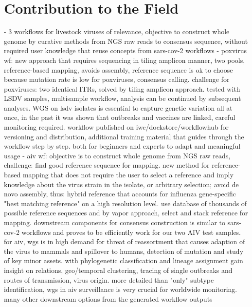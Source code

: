 \section{Contribution to the Field}
- 3 workflows for livestock viruses of relevance, objective to construct whole genome by curative methods from NGS raw reads to consensus sequence, without required user knowledge that reuse concepts from sars-cov-2 workflows 
- poxvirus wf: new approach that requires sequencing in tiling amplicon manner, two pools, reference-based mapping, avoids assembly, reference sequence is ok to choose because mutation rate is low for poxviruses, consensus calling. challenge for poxviruses: two identical ITRs, solved by tiling amplicon approach. tested with LSDV samples, multisample workflow, analysis can be continued by subsequent analyses. WGS on lsdv isolates is essential to capture genetic variation all at once, in the past it was shown that outbreaks and vaccines are linked, careful monitoring required. workflow published on iwc/dockstore/workflowhub for versioning and distribution, additional training material that guides through the workflow step by step. both for beginners and experts to adapt and meaningful usage
- aiv wf: objective is to construct whole genome from NGS raw reads, challenge: find good reference sequence for mapping. new method for reference-based mapping that does not require the user to select a reference and imply knowledge about the virus strain in the isolate, or arbitrary selection; avoid de novo assembly, thus: hybrid reference that accounts for influenza gene-specific "best matching reference" on a high resolution level. use database of thousands of possible reference sequences and by vapor approach, select and stack reference for mapping. downstream components for consensus construction is similar to sars-cov-2 workflows and proves to be efficiently work for our two AIV test samples. for aiv, wgs is in high demand for threat of reassortment that causes adaption of the virus to mammals and spillover to humans, detection of mutation and study of key minor assets. with phylogenetic classification and lineage assignment gain insight on relations, geo/temporal clustering, tracing of single outbreaks and routes of transmission, virus origin. more detailed than "only" subtype identification, wgs in aiv surveillance is very crucial for worldwide monitoring. many other downstream options from the generated workflow outputs
